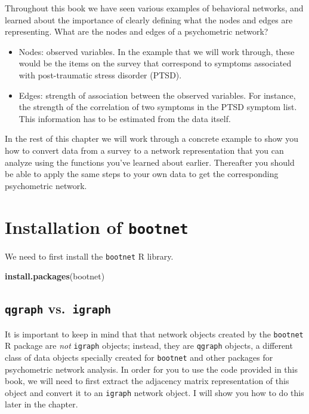 \documentclass[
]{book}
\newenvironment{Shaded}{\begin{snugshade}}{\end{snugshade}}
\newcommand{\FunctionTok}[1]{\textcolor[rgb]{0.13,0.29,0.53}{\textbf{#1}}}
\newcommand{\NormalTok}[1]{#1}
\newcommand{\StringTok}[1]{\textcolor[rgb]{0.31,0.60,0.02}{#1}}
\providecommand{\tightlist}{%
  \setlength{\itemsep}{0pt}\setlength{\parskip}{0pt}}
\begin{document}
Throughout this book we have seen various examples of behavioral networks, and learned about the importance of clearly defining what the nodes and edges are representing. What are the nodes and edges of a psychometric network?

\begin{itemize}
\tightlist
\item
  Nodes: observed variables. In the example that we will work through, these would be the items on the survey that correspond to symptoms associated with post-traumatic stress disorder (PTSD).
\item
  Edges: strength of association between the observed variables. For instance, the strength of the correlation of two symptoms in the PTSD symptom list. This information has to be estimated from the data itself.
\end{itemize}

In the rest of this chapter we will work through a concrete example to show you how to convert data from a survey to a network representation that you can analyze using the functions you've learned about earlier. Thereafter you should be able to apply the same steps to your own data to get the corresponding psychometric network.

\section{\texorpdfstring{Installation of \texttt{bootnet}}{Installation of bootnet}}\label{installation-of-bootnet}

We need to first install the \texttt{bootnet} R library.

\begin{Shaded}
\begin{Highlighting}[]
\FunctionTok{install.packages}\NormalTok{(}\StringTok{\textquotesingle{}bootnet\textquotesingle{}}\NormalTok{)}
\end{Highlighting}
\end{Shaded}

\subsection{\texorpdfstring{\texttt{qgraph} vs.~\texttt{igraph}}{qgraph vs.~igraph}}\label{qgraph-vs.-igraph}

It is important to keep in mind that that network objects created by the \texttt{bootnet} R package are \emph{not} \texttt{igraph} objects; instead, they are \texttt{qgraph} objects, a different class of data objects specially created for \texttt{bootnet} and other packages for psychometric network analysis. In order for you to use the code provided in this book, we will need to first extract the adjacency matrix representation of this object and convert it to an \texttt{igraph} network object. I will show you how to do this later in the chapter.
\end{document}
